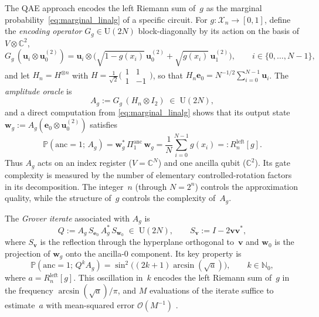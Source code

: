 \documentclass[12pt,a4paper]{article}
\theoremstyle{plain}
\theoremstyle{definition}
\theoremstyle{remark}
\begin{document}
The QAE approach encodes the left Riemann sum of~$g$ as the marginal
probability~\eqref{eq:marginal_linalg} of a specific circuit.
For $g:\mathcal{X}_n\to[0,1]$, define the \emph{encoding operator}
$G_g\in\mathrm{U}(2N)$ block-diagonally by its action on the basis of
$V\otimes\mathbb{C}^2$,
\begin{equation}
  G_g\,(\mathbf{u}_i\otimes\mathbf{u}_0^{(2)})
  = \mathbf{u}_i\otimes
    \bigl(\sqrt{1-g(x_i)}\,\mathbf{u}_0^{(2)}
         +\sqrt{g(x_i)}\,\mathbf{u}_1^{(2)}\bigr),
  \qquad i\in\{0,\ldots,N-1\},
  \label{eq:Gg_def}
\end{equation}
and let $H_n = H^{\otimes n}$ with
$H = \tfrac{1}{\sqrt{2}}
\bigl(\begin{smallmatrix}1&1\\1&-1\end{smallmatrix}\bigr)$,
so that $H_n\mathbf{e}_0 = N^{-1/2}\sum_{i=0}^{N-1}\mathbf{u}_i$.
The \emph{amplitude oracle} is
\begin{equation}
  A_g := G_g\,(H_n\otimes I_2) \;\in\; \mathrm{U}(2N),
  \label{eq:Ag_def}
\end{equation}
and a direct computation from \eqref{eq:marginal_linalg} shows that its
output state
$\mathbf{w}_g := A_g(\mathbf{e}_0\otimes\mathbf{u}_0^{(2)})$
satisfies
\begin{equation}
  \mathbb{P}(\mathrm{anc}=1;\, A_g)
  = \mathbf{w}_g^*\,\Pi_1^{\mathrm{anc}}\,\mathbf{w}_g
  = \frac{1}{N}\sum_{i=0}^{N-1} g(x_i)
  =: R_n^{\mathrm{left}}[g].
  \label{eq:oracle_prob}
\end{equation}
Thus $A_g$ acts on an index register ($V = \mathbb{C}^N$) and one
ancilla qubit ($\mathbb{C}^2$).
Its gate complexity is measured by the number of elementary
controlled-rotation factors in its decomposition.
The integer~$n$ (through $N=2^n$) controls the approximation quality,
while the structure of~$g$ controls the complexity of~$A_g$.

The \emph{Grover iterate} associated with $A_g$ is
\begin{equation}
  Q := A_g\,S_{\mathbf{e}_0}\,A_g^*\,S_{\mathbf{w}_0}
  \;\in\;\mathrm{U}(2N),
  \qquad S_{\mathbf{v}} := I - 2\mathbf{v}\mathbf{v}^*,
  \label{eq:grover_def}
\end{equation}
where $S_{\mathbf{v}}$ is the reflection through the hyperplane
orthogonal to~$\mathbf{v}$ and $\mathbf{w}_0$ is the projection of
$\mathbf{w}_g$ onto the ancilla-$0$ component.
Its key property is
\begin{equation}
  \mathbb{P}(\mathrm{anc}=1;\, Q^k A_g)
  = \sin^2\!\bigl((2k+1)\arcsin(\sqrt{a})\bigr),
  \qquad k \in \mathbb{N}_0,
  \label{eq:qae_prob}
\end{equation}
where $a = R_n^{\mathrm{left}}[g]$.
This oscillation in~$k$ encodes the left Riemann sum of~$g$ in the
frequency $\arcsin(\sqrt{a})/\pi$, and $M$ evaluations of the iterate
suffice to estimate~$a$ with mean-squared error $\mathcal{O}(M^{-1})$
\cite{BrassardHoyerMoscaTapp2002}.
\end{document}

